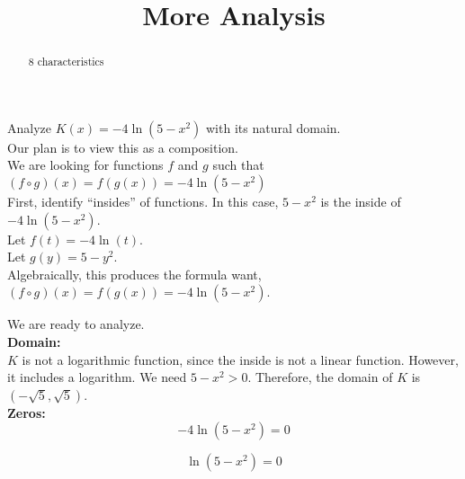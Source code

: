 \documentclass{ximera}
\title{More Analysis}
\begin{document}
\begin{abstract}
8 characteristics
\end{abstract}
\maketitle












Analyze $K(x) = -4 \ln(5 - x^2)$ with its natural domain. \\

Our plan is to view this as a composition. \\






We are looking for functions $f$ and $g$ such that $(f \circ g)(x) = f(g(x)) = -4 \ln(5 - x^2)$ \\


First, identify ``insides'' of functions.  In this case, $5 - x^2$ is the inside of $-4 \ln(5 - x^2)$. \\




Let $f(t) = -4 \ln(t)$. \\

Let $g(y) = 5 - y^2$. \\


Algebraically, this produces the formula want, $(f \circ g)(x) = f(g(x)) = -4 \ln(5 - x^2)$.



We are ready to analyze. \\




\textbf{\textcolor{blue!55!black}{Domain:}} \\


$K$ is not a logarithmic function, since the inside is not a linear function.  However, it includes a logarithm. We need $5 - x^2 > 0$.  Therefore, the domain of $K$ is $(-\sqrt{5}, \sqrt{5})$. \\



\textbf{\textcolor{blue!55!black}{Zeros:}} \\




\[
-4 \ln(5 - x^2) = 0
\]


\[
 \ln(5 - x^2) = 0
\]
\end{document}
